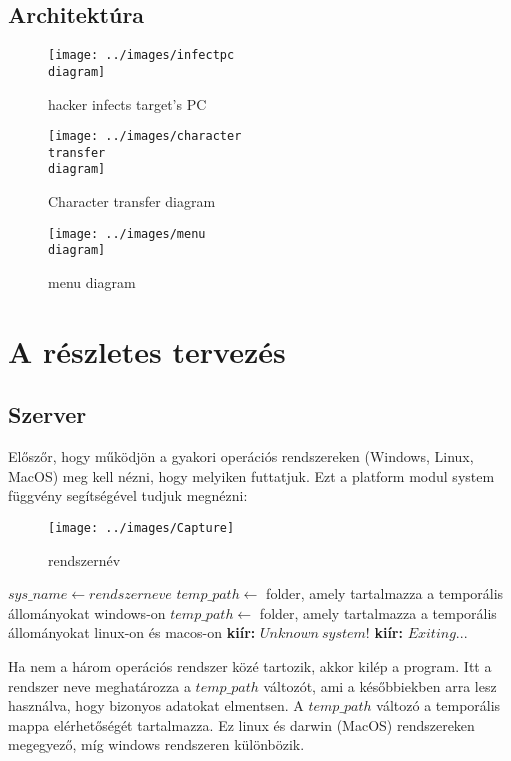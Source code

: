 \documentclass[a4paper, 11pt]{article}
\begin{document}
\subsection{Architektúra}
\begin{figure}[H]
\centering
\texttt{[image: ../images/infectpc\\ diagram]}
\caption{hacker infects target's PC}
\label{fig:infectpcdia}
\end{figure}

\begin{figure}[H]
\centering
\texttt{[image: ../images/character\\ transfer\\ diagram]}
\caption{Character transfer diagram}
\label{fig:chartransferdia}
\end{figure}

\begin{figure}[H]
\centering
\texttt{[image: ../images/menu\\ diagram]}
\caption{menu diagram}
\label{fig:menudia}
\end{figure}
\section{A részletes tervezés}\label{sec:plan}

\subsection{Szerver}\label{subsec:server}
Előszőr, hogy működjön a gyakori operációs rendszereken (Windows, Linux, MacOS) meg kell nézni, hogy melyiken futtatjuk. Ezt a platform modul system függvény segítségével tudjuk megnézni:
\begin{figure}[H]
\centering
\texttt{[image: ../images/Capture]}
\caption{rendszernév}
\label{fig:sysname}
\end{figure}

\begin{algorithmic}[H]
\State $sys\_name \gets rendszer neve$
	\State $temp\_path \gets$ folder, amely tartalmazza a temporális állományokat windows-on
	\State $temp\_path \gets$ folder, amely tartalmazza a temporális állományokat linux-on és macos-on
\Else
	\State \textbf{kiír:} $Unknown\ system!$
	\State \textbf{kiír:} $Exiting...$
\EndIf
\end{algorithmic}

\noindent Ha nem a három operációs rendszer közé tartozik, akkor kilép a program. Itt a rendszer neve meghatározza a $temp\_path$ változót, ami a későbbiekben arra lesz használva, hogy bizonyos adatokat elmentsen. A $temp\_path$ változó a temporális mappa elérhetőségét tartalmazza. Ez linux és darwin (MacOS) rendszereken megegyező, míg windows rendszeren különbözik.
\end{document}
